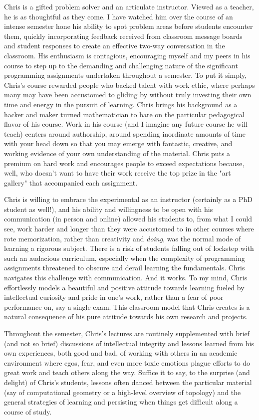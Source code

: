 \documentclass[a4paper, 11pt]{article} %
\begin{document}
Chris is a gifted problem solver and an articulate instructor. Viewed as a teacher, he is as thoughtful as they come. I have watched him over the course of an intense semester hone his ability to spot problem areas before students encounter them, quickly incorporating feedback received from classroom message boards and student responses to create an effective two-way conversation in the classroom. His enthusiasm is contagious, encouraging myself and my peers in his course to step up to the demanding and challenging nature of the significant programming assignments undertaken throughout a semester. To put it simply, Chris’s course rewarded people who backed talent with work ethic, where perhaps many may have been accustomed to gliding by without truly investing their own time and energy in the pursuit of learning. Chris brings his background as a hacker and maker turned mathematician to bare on the particular pedagogical flavor of his course. Work in his course (and I imagine any future course he will teach) centers around authorship, around spending inordinate amounts of time with your head down so that you may emerge with fantastic, creative, and working evidence of your own understanding of the material. Chris puts a premium on hard work and encourages people to exceed expectations because, well, who doesn't want to have their work receive the top prize in the "art gallery" that accompanied each assignment.


Chris is willing to embrace the experimental as an instructor (certainly as a PhD student as well!), and his ability and willingness to be open with his communication (in person and online) allowed his students to, from what I could see, work harder and longer than they were accustomed to in other courses where rote memorization, rather than creativity and \textit{doing}, was the normal mode of learning a rigorous subject. There is a risk of students falling out of lockstep with such an audacious curriculum, especially when the complexity of programming assignments threatened to obscure and derail learning the fundamentals. Chris navigates this challenge with communication. And it works. To my mind, Chris effortlessly models a beautiful and positive attitude towards learning fueled by intellectual curiosity and pride in one’s work, rather than a fear of poor performance on, say a single exam. This classroom model that Chris creates is a natural consequence of his pure attitude towards his own research and projects. 


Throughout the semester, Chris’s lectures are routinely supplemented with brief (and not so brief) discussions of intellectual integrity and lessons learned from his own experiences, both good and bad, of working with others in an academic environment where egos, fear, and even more toxic emotions plague efforts to do great work and teach others along the way. Suffice it to say, to the surprise (and delight) of Chris’s students, lessons often danced between the particular material (say of computational geometry or a high-level overview of topology) and the general strategies of learning and persisting when things get difficult along a course of study.
\end{document}
